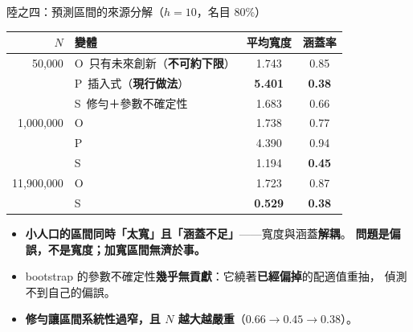 \documentclass[aspectratio=169, UTF8, fontset=macnew, 11pt]{ctexbeamer}
\newcommand{\hi}[1]{\textcolor{red!70!black}{\textbf{#1}}}
\begin{document}
\begin{frame}{陸之四：預測區間的來源分解\quad\small（$h=10$，名目 80\%）}
\begin{center}\small
\begin{tabular}{rlcc}
\toprule
$N$ & 變體 & 平均寬度 & 涵蓋率\\
\midrule
50,000 & O\ 只有未來創新（\textbf{不可約下限}） & 1.743 & 0.85\\
 & P\ 插入式（\textbf{現行做法}） & \hi{5.401} & \hi{0.38}\\
 & S\ 修勻＋參數不確定性 & 1.683 & 0.66\\
\midrule
1,000,000 & O & 1.738 & 0.77\\
 & P & 4.390 & 0.94\\
 & S & 1.194 & \hi{0.45}\\
\midrule
11,900,000 & O & 1.723 & 0.87\\
 & S & \hi{0.529} & \hi{0.38}\\
\bottomrule
\end{tabular}
\end{center}
\vspace{4pt}
\begin{itemize}\footnotesize
  \item \hi{小人口的區間同時「太寬」且「涵蓋不足」}——寬度與涵蓋\textbf{解耦}。
        \textbf{問題是偏誤，不是寬度；加寬區間無濟於事。}
  \item bootstrap 的參數不確定性\hi{幾乎無貢獻}：它繞著\textbf{已經偏掉}的配適值重抽，
        偵測不到自己的偏誤。
  \item \hi{修勻讓區間系統性過窄，且 $N$ 越大越嚴重}（$0.66\to0.45\to0.38$）。
\end{itemize}
\end{frame}
\end{document}
